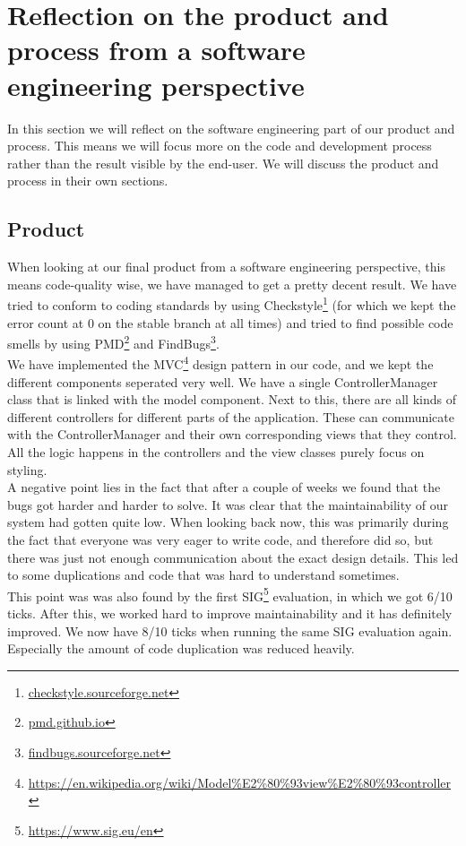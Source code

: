 \section{Reflection on the product and process from a software engineering perspective}

In this section we will reflect on the software engineering part of our product and process. This means we will focus more on the code and development process rather than the result visible by the end-user. We will discuss the product and process in their own sections.

\subsection{Product}
When looking at our final product from a software engineering perspective, this means code-quality wise, we have managed to get a pretty decent result. We have tried to conform to coding standards by using Checkstyle\footnote{\url{checkstyle.sourceforge.net}} (for which we kept the error count at 0 on the stable branch at all times) and tried to find possible code smells by using PMD\footnote{\url{pmd.github.io}} and FindBugs\footnote{\url{findbugs.sourceforge.net}}.\\
We have implemented the MVC\footnote{\url{https://en.wikipedia.org/wiki/Model\%E2\%80\%93view\%E2\%80\%93controller}} design pattern in our code, and we kept the different components seperated very well. We have a single ControllerManager class that is linked with the model component. Next to this, there are all kinds of different controllers for different parts of the application. These can communicate with the ControllerManager and their own corresponding views that they control. All the logic happens in the controllers and the view classes purely focus on styling.\\
A negative point lies in the fact that after a couple of weeks we found that the bugs got harder and harder to solve. It was clear that the maintainability of our system had gotten quite low. When looking back now, this was primarily during the fact that everyone was very eager to write code, and therefore did so, but there was just not enough communication about the exact design details. This led to some duplications and code that was hard to understand sometimes.\\
This point was was also found by the first SIG\footnote{\url{https://www.sig.eu/en}} evaluation, in which we got 6/10 ticks. After this, we worked hard to improve maintainability and it has definitely improved. We now have 8/10 ticks when running the same SIG evaluation again. Especially the amount of code duplication was reduced heavily.\\


